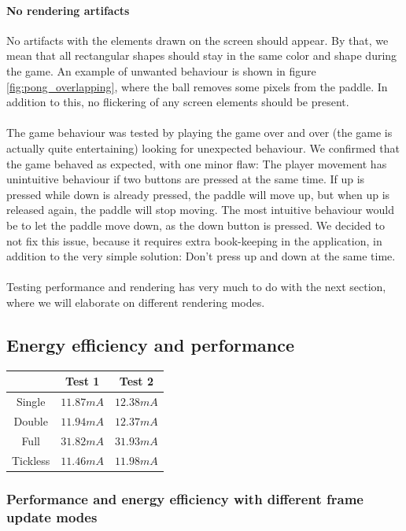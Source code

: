 \paragraph{No rendering artifacts}
No artifacts with the elements drawn on the screen should appear. By that, we mean that all rectangular shapes should stay in the same color and shape during the game. An example of unwanted behaviour is shown in figure \ref{fig:pong_overlapping}, where the ball removes some pixels from the paddle. In addition to this, no flickering of any screen elements should be present. \\
\\
The game behaviour was tested by playing the game over and over (the game is actually quite entertaining) looking for unexpected behaviour. We confirmed that the game behaved as expected, with one minor flaw: The player movement has unintuitive behaviour if two buttons are pressed at the same time. If up is pressed while down is already pressed, the paddle will move up, but when up is released again, the paddle will stop moving. The most intuitive behaviour would be to let the paddle move down, as the down button is pressed. We decided to not fix this issue, because it requires extra book-keeping in the application, in addition to the very simple solution: Don't press up and down at the same time.\\
\\
Testing performance and rendering has very much to do with the next section, where we will elaborate on different rendering modes.

\subsection{Energy efficiency and performance}
\begin{table}
	\begin{tabular}{c|c|c}
		\hline
		\hline
		& Test 1 & Test 2\\
		\hline
		Single & $11.87mA$ & $12.38mA$ \\
		Double & $11.94mA$ & $12.37mA$ \\
		Full & $31.82mA$ & $31.93mA$ \\
		Tickless & $11.46mA$ & $11.98mA$ \\
		\hline
		
	
	\end{tabular}
\end{table}

\subsubsection{Performance and energy efficiency with different frame update modes}

